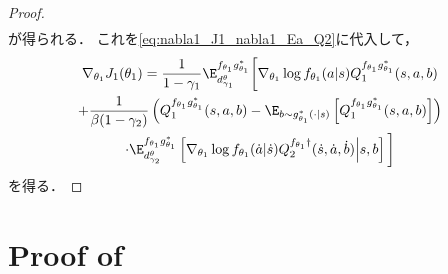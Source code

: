 \documentclass[a4paper,10pt,dvipdfmx]{jsarticle}
\begin{document}
\begin{proof}
\begin{align}
\end{align}
が得られる．
これを\cref{eq:nabla1_J1_nabla1_Ea_Q2}に代入して，
\begin{multline}
    \nabla_{\theta_1}J_1(\theta_1)=\dfrac{1}{1-\gamma_1}\E_{d_{\gamma_1}^{\theta}}^{f_{\theta_1}g_{\theta_1}^*}\bigg[\nabla_{\theta_1}\log f_{\theta_1}(a|s)Q_1^{f_{\theta_1}g_{\theta_1}^*}(s,a,b)\\
    +\dfrac{1}{\beta(1-\gamma_2)}\left(Q_1^{f_{\theta_1}g_{\theta_1}^*}(s,a,b) - \E_{b\sim g_{\theta_1}^*(\cdot|s)}\left[Q_1^{f_{\theta_1}g_{\theta_1}^*}(s,a,b)\right]\right)\\
    \cdot\E_{d_{\gamma_2}^{\theta}}^{f_{\theta_1}g_{\theta_1}^*}\left[\nabla_{\theta_1}\log f_{\theta_1}(\dot{a}|\dot{s})Q_2^{f_{\theta_1}\dag}(\dot{s},\dot{a},\dot{b})\middle|s,b\right]\bigg]
\end{multline}
を得る．
\end{proof}


\section{Proof of }\label{sec:proof_SPG_qr_bbf_1}
\end{document}
